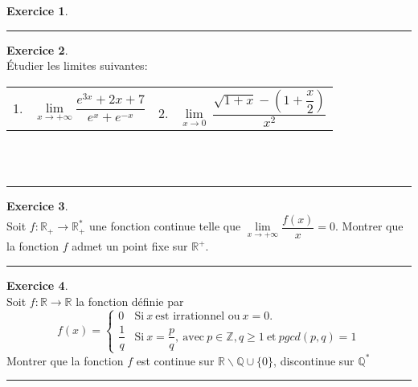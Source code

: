 \documentclass[a4paper,10pt]{article}
\theoremstyle{definition}
\theoremstyle{definition}
\newtheorem{exo}{Exercice}
\newcommand{\R}{\mathbb{R}}
\newcommand{\Q}{\mathbb{Q}}
\newcommand{\Z}{\mathbb{Z}}
\begin{document}
\begin{minipage}{1\linewidth}
\begin{minipage}[t]{0.48\linewidth}
\begin{exo}
\centering
\rule{1\linewidth}{0.6pt}
\end{exo}

\begin{exo}\quad\\
Étudier les limites suivantes:

\begin{tabular}{cc}
 1. \   $\lim\limits_{x\rightarrow+\infty} \dfrac{e^{3x}+2x+7}{e^x + e^{-x}}$
&2. \ $\lim\limits_{x\rightarrow 0}~\dfrac{\sqrt{1+x} - \left(1+ \dfrac{x}{2}\right) }{x^2 } $
\end{tabular}
\hfill\\ \hfill\\
\centering\rule{1\linewidth}{0.6pt}
\end{exo}
\begin{exo}\quad\\
Soit $f:\R_+\rightarrow\R_+^*$ une fonction continue telle que $\lim\limits_{x\rightarrow+\infty}\dfrac{f(x)}{x} = 0$. Montrer que la fonction $f$ admet un point fixe sur $\R^+$.

\centering
\rule{1\linewidth}{0.6pt}
\end{exo}
\begin{exo}\quad\\
Soit $f: \R\rightarrow\R$ la fonction définie par 
$$f(x) =\left\{\begin{array}{cl}
0  & \text{Si} \ x \   \text{est irrationnel ou} \  x=0. \\
\dfrac{1}{q} & \text{Si} \  x=\dfrac{p}{q},\ \text{avec} \  p\in\Z, q\geq 1 \ \text{et} \ pgcd(p,q) =1  
\end{array}\right.$$
Montrer que la fonction $f$ est continue sur $\R \backslash \Q\cup\{0\}$, discontinue sur $\Q^*$ \\

\centering
\rule{1\linewidth}{0.6pt}
\end{exo}

\end{minipage}
\end{minipage}
\newpage
\end{document}
